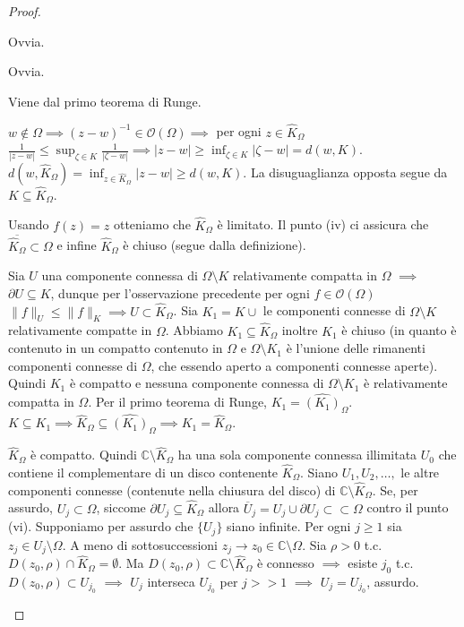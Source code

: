 \begin{proof}
  \begin{nlist}
    \item Ovvia.
    \item Ovvia.
    \item Viene dal primo teorema di Runge.
    \item $w \not\in \Omega \implies (z-w)^{-1} \in \mathcal{O}(\Omega) \implies$ per ogni $z \in \widehat{K}_{\Omega}$ $\displaystyle \frac{1}{|z-w|}\le \sup_{\zeta \in K} \frac{1}{|\zeta-w|} \implies |z-w| \ge \inf_{\zeta \in K} |\zeta-w|=d(w, K)$.
    $\displaystyle d(w, \widehat{K}_{\Omega})=\inf_{z \in \widehat{K}_{\Omega}}|z-w| \ge d(w, K)$. La disuguaglianza opposta segue da $K \subseteq \widehat{K}_{\Omega}$.
    \item Usando $f(z)=z$ otteniamo che $\widehat{K}_{\Omega}$ è limitato. Il punto (iv) ci assicura che $\overline{\widehat{K}_{\Omega}} \subset \Omega$ e infine $\widehat{K}_{\Omega}$ è chiuso (segue dalla definizione).
    \item Sia $U$ una componente connessa di $\Omega \setminus K$ relativamente compatta in $\Omega$ $\implies$ $\partial U \subseteq K$, dunque per l'osservazione precedente per ogni $f \in \mathcal{O}(\Omega)$ $\|f\|_U \le \|f\|_K \implies U \subset \widehat{K}_{\Omega}$.
    Sia $K_1=K \cup$ le componenti connesse di $\Omega \setminus K$ relativamente compatte in $\Omega$. Abbiamo $K_1 \subseteq \widehat{K}_{\Omega}$ inoltre $K_1$ è chiuso (in quanto è contenuto in un compatto contenuto in $\Omega$ e $\Omega \setminus K_1$ è l'unione delle rimanenti componenti connesse di $\Omega$, che essendo aperto a componenti connesse aperte). Quindi $K_1$ è compatto e nessuna componente connessa di $\Omega \setminus K_1$ è relativamente compatta in $\Omega$. Per il primo teorema di Runge, $K_1=\widehat{(K_1)}_{\Omega}$.
    $K \subseteq K_1 \implies \widehat{K}_{\Omega} \subseteq \widehat{(K_1)}_{\Omega} \implies K_1=\widehat{K}_{\Omega}$.
    \item $\widehat{K}_{\Omega}$ è compatto. Quindi $\mathbb{C} \setminus \widehat{K}_{\Omega}$ ha una sola componente connessa illimitata $U_0$ che contiene il complementare di un disco contenente $\widehat{K}_{\Omega}$. Siano $U_1, U_2, \dots,$ le altre componenti connesse (contenute nella chiusura del disco) di $\mathbb{C}\setminus\widehat{K}_{\Omega}$.
    Se, per assurdo, $U_j \subset \Omega$, siccome $\partial U_j \subseteq \widehat{K}_{\Omega}$ allora $\overline{U}_j=U_j \cup \partial U_j \subset \subset \Omega$ contro il punto (vi). Supponiamo per assurdo che $\{U_j\}$ siano infinite. Per ogni $j \ge 1$ sia $z_j \in U_j \setminus \Omega$. A meno di sottosuccessioni $z_j \longrightarrow z_0 \in \mathbb{C} \setminus \Omega$.
    Sia $\rho>0$ t.c. $D(z_0, \rho) \cap \widehat{K}_{\Omega}=\emptyset$. Ma $D(z_0, \rho) \subset \mathbb{C}\setminus\widehat{K}_{\Omega}$ è connesso $\implies$ esiste $j_0$ t.c. $D(z_0, \rho) \subset U_{j_0}$ $\implies$ $U_j$ interseca $U_{j_0}$ per $j>>1$ $\implies$ $U_j=U_{j_0}$, assurdo.
  \end{nlist}
\end{proof}

